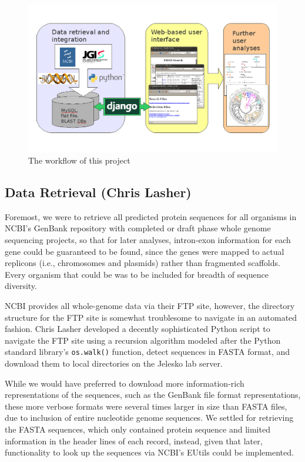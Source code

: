 \documentclass[11pt,letterpaper,twoside,english]{article}
\begin{document}
\begin{figure}[btp]
    \begin{center}
        \includegraphics[width=0.95\linewidth]{figures/workflow.png}
    \end{center}
    \caption{\label{fig:The-workflow-of}The workflow of this project}
\end{figure}

\subsection{\label{sub:Data-Retrieval}Data Retrieval (Chris Lasher)}

Foremost, we were to retrieve all predicted protein sequences for all
organisms in NCBI's GenBank repository with completed or draft phase whole
genome sequencing projects, so that for later analyses, intron-exon
information for each gene could be guaranteed to be found, since the genes
were mapped to actual replicons (i.e., chromosomes and plasmids) rather than
fragmented scaffolds. Every organism that could be was to be included for
breadth of sequence diversity.

NCBI provides all whole-genome data via their FTP site, however, the directory
structure for the FTP site is somewhat troublesome to navigate in an automated
fashion. Chris Lasher developed a decently sophisticated Python script to
navigate the FTP site using a recursion algorithm modeled after the Python
standard library's \texttt{os.walk()} function, detect sequences in FASTA
format, and download them to local directories on the Jelesko lab server.

While we would have preferred to download more information-rich
representations of the sequences, such as the GenBank file format
representations, these more verbose formats were several times larger in size
than FASTA files, due to inclusion of entire nucleotide genome sequences. We
settled for retrieving the FASTA sequences, which only contained protein
sequence and limited information in the header lines of each record, instead,
given that later, functionality to look up the sequences via NCBI's EUtils
could be implemented.
\end{document}
